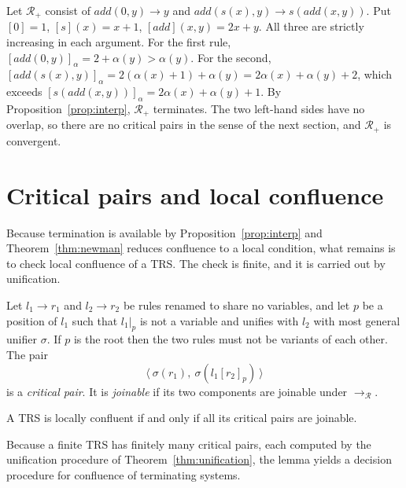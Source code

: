 \begin{example}[Addition]
\label{ex:addition}
Let $\mathcal{R}_{+}$ consist of $\mathit{add}(0,y)\to y$ and $\mathit{add}(s(x),y)\to s(\mathit{add}(x,y))$. Put $[0]=1$, $[s](x)=x+1$, $[\mathit{add}](x,y)=2x+y$. All three are strictly increasing in each argument. For the first rule, $[\mathit{add}(0,y)]_\alpha=2+\alpha(y)>\alpha(y)$. For the second, $[\mathit{add}(s(x),y)]_\alpha=2(\alpha(x)+1)+\alpha(y)=2\alpha(x)+\alpha(y)+2$, which exceeds $[s(\mathit{add}(x,y))]_\alpha=2\alpha(x)+\alpha(y)+1$. By Proposition~\ref{prop:interp}, $\mathcal{R}_{+}$ terminates. The two left-hand sides have no overlap, so there are no critical pairs in the sense of the next section, and $\mathcal{R}_{+}$ is convergent.
\end{example}

\section{Critical pairs and local confluence}
\label{sec:critical}

Because termination is available by Proposition~\ref{prop:interp} and Theorem~\ref{thm:newman} reduces confluence to a local condition, what remains is to check local confluence of a TRS. The check is finite, and it is carried out by unification.

\begin{definition}
\label{def:critical-pair}
Let $l_1\to r_1$ and $l_2\to r_2$ be rules renamed to share no variables, and let $p$ be a position of $l_1$ such that $l_1|_p$ is not a variable and unifies with $l_2$ with most general unifier $\sigma$. If $p$ is the root then the two rules must not be variants of each other. The pair
\[
\langle\ \sigma(r_1),\ \sigma(l_1[r_2]_p)\ \rangle
\]
is a \emph{critical pair}. It is \emph{joinable} if its two components are joinable under $\to_{\mathcal{R}}$.
\end{definition}

\begin{lemma}
\label{lem:cpl}
 A TRS is locally confluent if and only if all its critical pairs are joinable.
\end{lemma}

Because a finite TRS has finitely many critical pairs, each computed by the unification procedure of Theorem~\ref{thm:unification}, the lemma yields a decision procedure for confluence of terminating systems.

